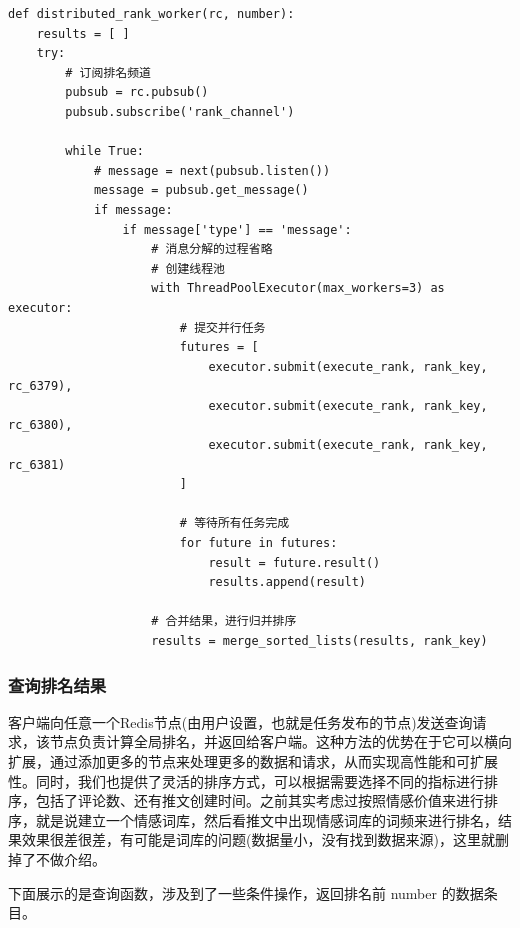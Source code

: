 \documentclass[12pt,hyperref,a4paper,UTF8]{ctexart}
\begin{document}
\begin{verbatim} 
def distributed_rank_worker(rc, number):
    results = [ ]
    try:
        # 订阅排名频道
        pubsub = rc.pubsub()
        pubsub.subscribe('rank_channel')

        while True:
            # message = next(pubsub.listen())
            message = pubsub.get_message()
            if message:
                if message['type'] == 'message':
                    # 消息分解的过程省略
                    # 创建线程池
                    with ThreadPoolExecutor(max_workers=3) as executor:
                        # 提交并行任务
                        futures = [
                            executor.submit(execute_rank, rank_key, rc_6379),
                            executor.submit(execute_rank, rank_key, rc_6380),
                            executor.submit(execute_rank, rank_key, rc_6381)
                        ]
                        
                        # 等待所有任务完成
                        for future in futures:
                            result = future.result()  
                            results.append(result)

                    # 合并结果，进行归并排序
                    results = merge_sorted_lists(results, rank_key)
\end{verbatim} 

\subsubsection{查询排名结果}

客户端向任意一个Redis节点(由用户设置，也就是任务发布的节点)发送查询请求，该节点负责计算全局排名，并返回给客户端。这种方法的优势在于它可以横向扩展，通过添加更多的节点来处理更多的数据和请求，从而实现高性能和可扩展性。同时，我们也提供了灵活的排序方式，可以根据需要选择不同的指标进行排序，包括了评论数、还有推文创建时间。之前其实考虑过按照情感价值来进行排序，就是说建立一个情感词库，然后看推文中出现情感词库的词频来进行排名，结果效果很差很差，有可能是词库的问题(数据量小，没有找到数据来源)，这里就删掉了不做介绍。

下面展示的是查询函数，涉及到了一些条件操作，返回排名前 number 的数据条目。
\end{document}
